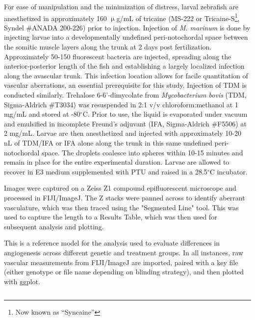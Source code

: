 For ease of manipulation and the minimization of distress, larval zebrafish are anesthetized in approximately 160 $\upmu$g/mL of tricaine (MS\hyp{}222 or Tricaine\hyp{}S\footnote{Now known as ``Syncaine''}, Syndel \#ANADA 200\hyp{}226) prior to injection. Injection of \textit{M. marinum} is done by injecting larvae into a developmentally undefined peri\hyp{}notochordal space between the somitic muscle layers along the trunk at 2 days post fertilization. Approximately 50\hyp{}150 fluorescent bacteria are injected, spreading along the anterior\hyp{}posterior length of the fish and establishing a largely localized infection along the avascular trunk. This infection location allows for facile quantitation of vascular aberrations, an essential prerequisite for this study. Injection of TDM is conducted similarly. Trehalose 6\hyp{}6'\hyp{}dimycolate from \textit{Mycobacterium bovis} (TDM, Sigma\hyp{}Aldrich \#T3034) was resuspended in 2:1 v/v chloroform:methanol at 1 mg/mL and stored at \hyp{}80$^{\circ}$C. Prior to use, the liquid is evaporated under vacuum and emulsified in incomplete Freund's adjuvant (IFA, Sigma\hyp{}Aldrich \#F5506) at 2 mg/mL. Larvae are then anesthetized and injected with approximately 10\hyp{}20 nL of TDM/IFA or IFA alone along the trunk in this same undefined peri\hyp{}notochordal space. The droplets coalesce into spheres within 10\hyp{}15 minutes and remain in place for the entire experimental duration. Larvae are allowed to recover in E3 medium supplemented with PTU and raised in a 28.5$^{\circ}$C incubator.

Images were captured on a Zeiss Z1 compound epifluorescent microscope and processed in FIJI/ImageJ. The Z stacks were panned across to identify aberrant vasculature, which was then traced using the "Segmented Line" tool. This was used to capture the length to a Results Table, which was then used for subsequent analysis and plotting.

\begin{code}
\caption{This is a reference model for the analysis used to evaluate differences in angiogenesis across different genetic and treatment groups. In all instances, raw vascular measurements from FIJI/ImageJ are imported, paired with a key file (either genotype or file name depending on blinding strategy), and then plotted with ggplot.}
\label{zebrafishanalysis}

\inputminted[breaklines,frame=single,fontsize=\small]{r}{source/fish_plot_example.R}

\end{code}

